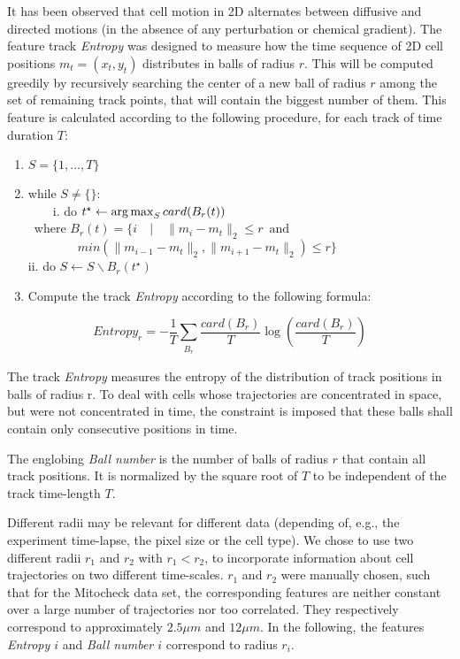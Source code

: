 It has been observed that cell motion in 2D alternates between
diffusive and directed motions (in the absence of any perturbation or
chemical gradient). %
The feature track \textit{Entropy} was designed to measure how the time
sequence of 2D cell positions $m_t=(x_t, y_t)$ distributes in balls of radius $r$. This will be computed greedily by recursively searching the center of a new ball of radius $r$ among the set of remaining track points, that will contain the biggest number of them. This
feature is calculated according to the following procedure, for each
track of time duration $T$: 
\begin{enumerate}
\item $S = \{1, \ldots, T\}$ 
\item while $S\neq\{\}$:\\
\ \ \ \ i. do $t^\star\leftarrow \operatorname*{arg\,max}_S card(B_r(t))$ \\ \ where
$B_r(t) = \{ i \quad | \quad \|m_i-m_t\|_2 \leq r \,\,\, \mbox{and}$ \\
\indent $\quad \quad \quad \quad min{(\|m_{i-1}-m_t\|_2,\|m_{i+1}-m_t\|_2)} \leq r \}$ \\
ii. do $S \leftarrow S \backslash B_r(t^\star) $

\item Compute the track \textit{Entropy} according to the following formula:
\end{enumerate}
\begin{equation}
Entropy_r= -\dfrac{1}{T} \sum_{\substack{B_r}} \dfrac{card(B_{r})}{T} \log(\dfrac{card(B_{r})}{T})
\end{equation}

The track \textit{Entropy} measures the entropy of the distribution of track positions in balls of radius r. To deal with cells whose trajectories are concentrated in space, but were not concentrated in time, the constraint is imposed that these balls shall contain only consecutive positions in time.

The englobing \textit{Ball number} is the number of balls of radius $r$ that contain all track positions. It is normalized by the square root of $T$ to be independent of the track time-length $T$.

Different radii may be relevant for different data (depending of,
e.g., the experiment time-lapse, the pixel size or the cell type). We
chose to use two different radii $r_1$ and $r_2$ with $r_1<r_2$, to
incorporate information about cell trajectories on two different
time-scales. $r_1$ and $r_2$ were manually chosen, such that for the Mitocheck data set, the corresponding features are neither constant over a large number of trajectories nor too correlated. They respectively correspond to approximately $2.5\mu m$ and $12\mu
m$. In the following, the features \textit{Entropy $i$} and 
\textit{Ball number $i$} correspond to radius $r_i$.  

